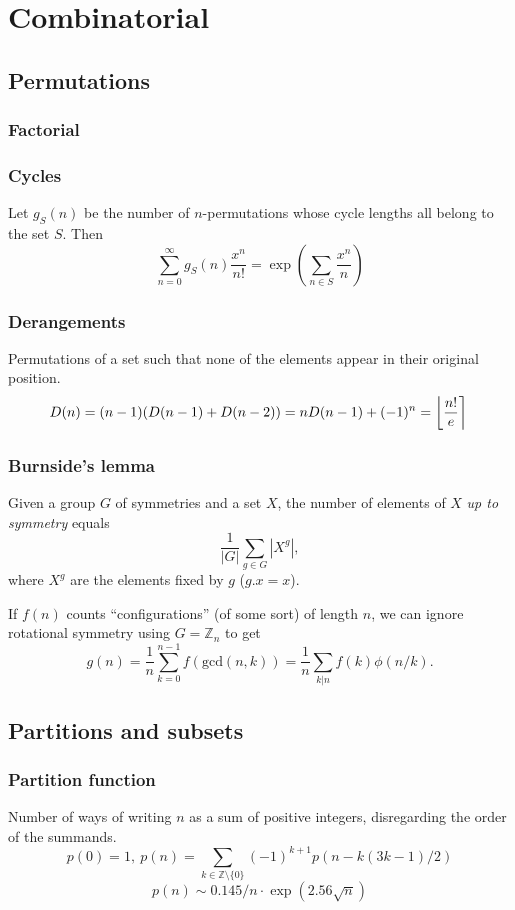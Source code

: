 \chapter{Combinatorial}

\section{Permutations}
	\subsection{Factorial}
		

	\subsection{Cycles}
		Let $g_S(n)$ be the number of $n$-permutations whose cycle lengths all belong to the set $S$. Then
		$$\sum_{n=0} ^\infty g_S(n) \frac{x^n}{n!} = \exp\left(\sum_{n\in S} \frac{x^n} {n} \right)$$

	\subsection{Derangements}
		Permutations of a set such that none of the elements appear in their original position.
		\[ \mkern-2mu D(n) = (n-1)(D(n-1)+D(n-2)) = n D(n-1)+(-1)^n = \left\lfloor\frac{n!}{e}\right\rceil \]

	\subsection{Burnside's lemma}
		Given a group $G$ of symmetries and a set $X$, the number of elements of $X$ \emph{up to symmetry} equals
		 \[ {\frac {1}{|G|}}\sum _{{g\in G}}|X^{g}|, \]
		 where $X^{g}$ are the elements fixed by $g$ ($g.x = x$).

		 If $f(n)$ counts ``configurations'' (of some sort) of length $n$, we can ignore rotational symmetry using $G = \mathbb Z_n$ to get
		 \[ g(n) = \frac 1 n \sum_{k=0}^{n-1}{f(\text{gcd}(n, k))} = \frac 1 n \sum_{k|n}{f(k)\phi(n/k)}. \]

\section{Partitions and subsets}
	\subsection{Partition function}
		Number of ways of writing $n$ as a sum of positive integers, disregarding the order of the summands.
		\[ p(0) = 1,\ p(n) = \sum_{k \in \mathbb Z \setminus \{0\}}{(-1)^{k+1} p(n - k(3k-1) / 2)} \]
		\[ p(n) \sim 0.145 / n \cdot \exp(2.56 \sqrt{n}) \]

